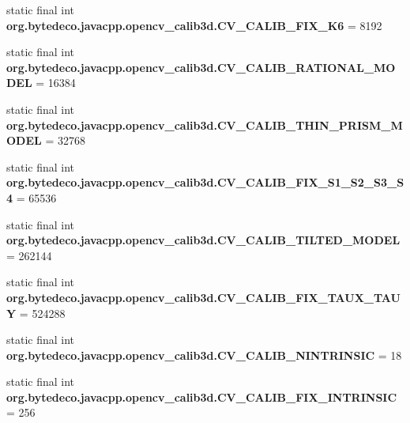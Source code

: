 \begin{DoxyCompactItemize}
static final int {\bfseries org.\+bytedeco.\+javacpp.\+opencv\+\_\+calib3d.\+C\+V\+\_\+\+C\+A\+L\+I\+B\+\_\+\+F\+I\+X\+\_\+\+K6} = 8192
\item 
\mbox{\label{group__calib3d__c_gae207008043487213303e162439ca4c54}} 
static final int {\bfseries org.\+bytedeco.\+javacpp.\+opencv\+\_\+calib3d.\+C\+V\+\_\+\+C\+A\+L\+I\+B\+\_\+\+R\+A\+T\+I\+O\+N\+A\+L\+\_\+\+M\+O\+D\+EL} = 16384
\item 
\mbox{\label{group__calib3d__c_ga1c5e6f24e680161b7a436d9e3c45f70b}} 
static final int {\bfseries org.\+bytedeco.\+javacpp.\+opencv\+\_\+calib3d.\+C\+V\+\_\+\+C\+A\+L\+I\+B\+\_\+\+T\+H\+I\+N\+\_\+\+P\+R\+I\+S\+M\+\_\+\+M\+O\+D\+EL} = 32768
\item 
\mbox{\label{group__calib3d__c_gacd32fe9b04da30ee218a9e142a905f50}} 
static final int {\bfseries org.\+bytedeco.\+javacpp.\+opencv\+\_\+calib3d.\+C\+V\+\_\+\+C\+A\+L\+I\+B\+\_\+\+F\+I\+X\+\_\+\+S1\+\_\+\+S2\+\_\+\+S3\+\_\+\+S4} = 65536
\item 
\mbox{\label{group__calib3d__c_ga8a514e6a709a8a6d73a2e404f56ee7d6}} 
static final int {\bfseries org.\+bytedeco.\+javacpp.\+opencv\+\_\+calib3d.\+C\+V\+\_\+\+C\+A\+L\+I\+B\+\_\+\+T\+I\+L\+T\+E\+D\+\_\+\+M\+O\+D\+EL} = 262144
\item 
\mbox{\label{group__calib3d__c_gab6631ef13c7943b0fe10b85044d4171a}} 
static final int {\bfseries org.\+bytedeco.\+javacpp.\+opencv\+\_\+calib3d.\+C\+V\+\_\+\+C\+A\+L\+I\+B\+\_\+\+F\+I\+X\+\_\+\+T\+A\+U\+X\+\_\+\+T\+A\+UY} = 524288
\item 
\mbox{\label{group__calib3d__c_gaea4c9527ebf952b123d3f1671e9d6f6f}} 
static final int {\bfseries org.\+bytedeco.\+javacpp.\+opencv\+\_\+calib3d.\+C\+V\+\_\+\+C\+A\+L\+I\+B\+\_\+\+N\+I\+N\+T\+R\+I\+N\+S\+IC} = 18
\item 
\mbox{\label{group__calib3d__c_gad9fdd6b6386597f86207f668fd408131}} 
static final int {\bfseries org.\+bytedeco.\+javacpp.\+opencv\+\_\+calib3d.\+C\+V\+\_\+\+C\+A\+L\+I\+B\+\_\+\+F\+I\+X\+\_\+\+I\+N\+T\+R\+I\+N\+S\+IC} = 256
\item 
\mbox{\label{group__calib3d__c_ga2a0d02e985ba13f58f03c441ebd88417}} 

\end{DoxyCompactItemize}
